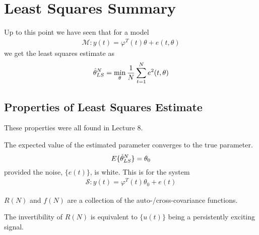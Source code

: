 \mainmatter%
\setcounter{page}{1}

\lectureseries[\course]{\course}

\date{September 24, 2009}

\setaddress%

\setcounter{lecture}{8}
\setcounter{chapter}{8}


\section{Least Squares Summary}
Up to this point we have seen that for a model
\begin{align}
\label{eq:09model}
\mathcal{M}: y(t) = \varphi^T(t)\theta + e(t,\theta)
\end{align}
we get the least squares estimate as
\begin{align}
\label{eq:lse}
\hat{\theta}_{LS}^N = \min_\theta\frac{1}{N}\sum_{t=1}^N e^2(t,\theta)
\end{align}

\subsection{Properties of Least Squares Estimate}
These properties were all found in Lecture 8.

The expected value of the estimated parameter converges to the true parameter.
$$E\{\hat{\theta}_{LS}^N\} = \theta_0$$
provided the noise, $\{e(t)\}$, is white.
This is for the system
\begin{align}
\label{eq:09sys}
\mathcal{S}: y(t) = \varphi^T(t)\theta_0 + e(t)
\end{align}

$R(N)$ and $f(N)$ are a collection of the auto-/cross-covariance functions.

The invertibility of $R(N)$ is equivalent to $\{u(t)\}$ being a persistently exciting signal.

